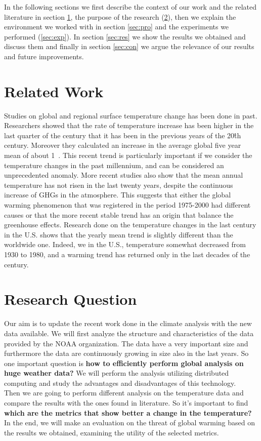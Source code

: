 \documentclass{vldb}
\begin{document}
In the following sections we first describe the context of our work and the related literature in section \ref{sec:rel}, the purpose of the research (\ref{sec:question}), then we explain the environment we worked with in section \ref{sec:pro} and the experiments we performed (\ref{sec:exp}). In section \ref{sec:res} we show the results we obtained and discuss them and finally in section \ref{sec:con} we argue the relevance of our results and future improvements.

\FloatBarrier

\section{Related Work}
\label{sec:rel}
Studies on global and regional surface temperature change has been done in past. Researchers showed that the rate of temperature increase has been higher in the last quarter of the century that it has been in the previous years of the 20\^{th} century. Moreover they calculated an increase in the average global five year mean of about 1\celsius~\cite{hansen1999giss}. This recent trend is particularly important if we consider the temperature changes in the past millennium, and can be considered an unprecedented anomaly\cite{mann1999northern}. More recent studies also show that the mean annual temperature has not risen in the last twenty years, despite the continuous increase of GHGs in the atmosphere\cite{kosaka2013recent}. This suggests that either the global warming phenomenon that was registered in the period 1975-2000 had different causes or that the more recent stable trend has an origin that balance the greenhouse effects.
Research done on the temperature changes in the last century in the U.S. shows that the yearly mean trend is slightly different than the worldwide one. Indeed, we in the U.S., temperature somewhat decreased from 1930 to 1980, and a warming trend has returned only in the last decades of the century\cite{hansen1999giss}.  

\FloatBarrier

\section{Research Question}
\label{sec:question}
Our aim is to update the recent work done in the climate analysis with the new data available. We will first analyze the structure and characteristics of the data provided by the NOAA organization.
The data have a very important size and furthermore the data are continuously growing in size also in the last years. So one important question is \textbf{how to efficiently perform global analysis on huge weather data?} We will perform the analysis utilizing distributed computing and study the advantages and disadvantages of this technology.\\
Then we are going to perform different analysis on the temperature data and compare the results with the ones found in literature. So it's important to find \textbf{which are the metrics that show better a change in the temperature?} In the end, we will make an evaluation on the threat of global warming based on the results we obtained, examining the utility of the selected metrics. \\
\end{document}
